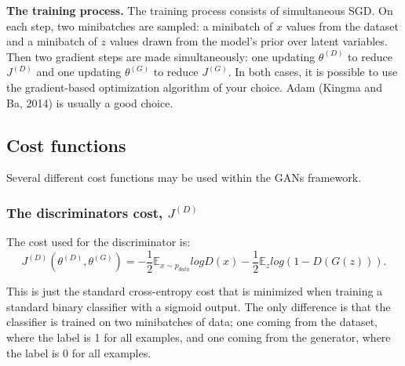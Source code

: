 \documentclass{scrartcl}
\begin{document}
\textbf{The training process.} The training process consists of simultaneous SGD. On each step, two minibatches are sampled: a minibatch of $x$ values from the
dataset and a minibatch of $z$ values drawn from the model’s prior over latent
variables. Then two gradient steps are made simultaneously: one updating $\theta^{(D)}$ to reduce $J^{(D)}$ and one updating $\theta^{(G)}$ to reduce $J^{(G)}$. In both cases, it is possible to use the gradient-based optimization algorithm of your choice. Adam (Kingma and Ba, 2014) is usually a good choice.

\subsection{Cost functions}
Several different cost functions may be used within the GANs framework.

\subsubsection{The discriminators cost, $J^{(D)}$}
The cost used for the discriminator is:
$$J^{(D)}(\theta^{(D)},\theta^{(G)}) = -\frac{1}{2} \mathbb{E}_{x \sim{} p_{data}} log D(x) - \frac{1}{2} \mathbb{E}_z log(1 - D(G(z))).$$

This is just the standard cross-entropy cost that is minimized when training
a standard binary classifier with a sigmoid output. The only difference is that the classifier is trained on two minibatches of data; one coming from the dataset, where the label is 1 for all examples, and one coming from the generator, where the label is 0 for all examples.


\newpage


\end{document}
